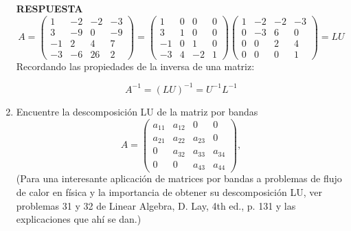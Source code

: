 \documentclass[11pt,letterpaper]{article}
\newcommand{\res}{\textbf{RESPUESTA}\\}
\begin{document}
\begin{enumerate}
\res 
\begin{equation*}
A=\left(\begin{array}{rrrr}
 1 & -2 & -2 &-3\\
 3 & -9 &  0 &-9\\
-1 &  2 &  4 & 7\\
-3 & -6 & 26 & 2
\end{array} \right)=
\left(\begin{array}{rrrr}
 1 &  0 &  0 & 0\\
 3 &  1 &  0 & 0\\
-1 &  0 &  1 & 0\\
-3 &  4 & -2 & 1
\end{array} \right) \left(\begin{array}{rrrr}
 1 & -2 & -2 & -3\\
 0 & -3 &  6 &  0\\
 0 &  0 &  2 &  4\\
 0 &  0 &  0 &  1
\end{array} \right)=LU
\end{equation*}
Recordando las propiedades de la inversa de una matriz:

$$A^{-1} = (LU)^{-1}=U^{-1}L^{-1}$$



\item Encuentre la descomposición LU de la matriz por bandas
\begin{equation*}
A=\left(\begin{array}{cccc}
a_{11} & a_{12} &   0    &    0  \\
a_{21} & a_{22} & a_{23} &    0  \\
    0  & a_{32} & a_{33} & a_{34}\\
    0  &   0    & a_{43} & a_{44}
\end{array} \right),
\end{equation*}
(Para una interesante aplicación de matrices por bandas a problemas de flujo de calor en física y la importancia de obtener su descomposición LU, ver problemas 31 y 32 de Linear Algebra, D. Lay, 4th ed., p. 131 y las explicaciones que ahí se dan.)


\end{enumerate}
\end{document}
